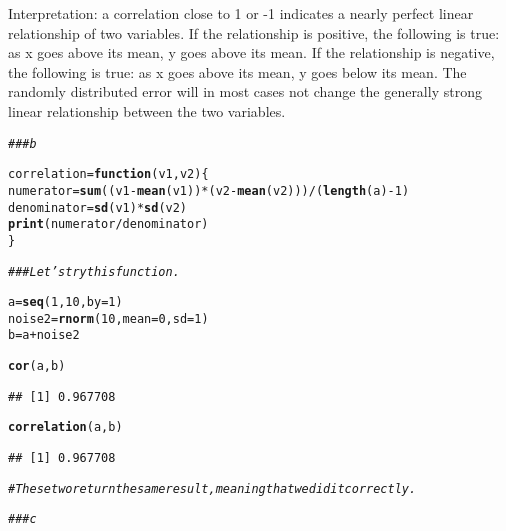 \documentclass[12pt,letter]{article}\usepackage[]{graphicx}\usepackage[]{color}
\makeatletter
\newcommand{\hlnum}[1]{\textcolor[rgb]{0.686,0.059,0.569}{#1}}%
\newcommand{\hlcom}[1]{\textcolor[rgb]{0.678,0.584,0.686}{\textit{#1}}}%
\newcommand{\hlopt}[1]{\textcolor[rgb]{0,0,0}{#1}}%
\newcommand{\hlstd}[1]{\textcolor[rgb]{0.345,0.345,0.345}{#1}}%
\newcommand{\hlkwa}[1]{\textcolor[rgb]{0.161,0.373,0.58}{\textbf{#1}}}%
\newcommand{\hlkwb}[1]{\textcolor[rgb]{0.69,0.353,0.396}{#1}}%
\newcommand{\hlkwc}[1]{\textcolor[rgb]{0.333,0.667,0.333}{#1}}%
\newcommand{\hlkwd}[1]{\textcolor[rgb]{0.737,0.353,0.396}{\textbf{#1}}}%
\newenvironment{kframe}{%
 \def\at@end@of@kframe{}%
 \ifinner\ifhmode%
  \def\at@end@of@kframe{\end{minipage}}%
  \begin{minipage}{\columnwidth}%
 \fi\fi%
 \def\FrameCommand##1{\hskip\@totalleftmargin \hskip-\fboxsep
 \colorbox{shadecolor}{##1}\hskip-\fboxsep
     \hskip-\linewidth \hskip-\@totalleftmargin \hskip\columnwidth}%
 \MakeFramed {\advance\hsize-\width
   \@totalleftmargin\z@ \linewidth\hsize
   \@setminipage}}%
 {\par\unskip\endMakeFramed%
 \at@end@of@kframe}
\newenvironment{knitrout}{}{} %
\makeatother
\begin{document}
Interpretation: a correlation close to 1 or -1 indicates a nearly perfect linear relationship of two variables. If the relationship is positive, the following is true: as x goes above its mean, y goes above its mean. If the relationship is negative, the following is true: as x goes above its mean, y goes below its mean. The randomly distributed error will in most cases not change the generally strong linear relationship between the two variables.

\begin{knitrout}
\color{fgcolor}\begin{kframe}
\begin{alltt}
\hlcom{### b}

\hlstd{correlation} \hlkwb{=} \hlkwa{function}\hlstd{(}\hlkwc{v1}\hlstd{,} \hlkwc{v2}\hlstd{) \{}
    \hlstd{numerator} \hlkwb{=} \hlkwd{sum}\hlstd{((v1} \hlopt{-} \hlkwd{mean}\hlstd{(v1))} \hlopt{*} \hlstd{(v2} \hlopt{-} \hlkwd{mean}\hlstd{(v2)))}\hlopt{/}\hlstd{(}\hlkwd{length}\hlstd{(a)} \hlopt{-} \hlnum{1}\hlstd{)}
    \hlstd{denominator} \hlkwb{=} \hlkwd{sd}\hlstd{(v1)} \hlopt{*} \hlkwd{sd}\hlstd{(v2)}
    \hlkwd{print}\hlstd{(numerator}\hlopt{/}\hlstd{denominator)}
\hlstd{\}}

\hlcom{### Let's try this function.}

\hlstd{a} \hlkwb{=} \hlkwd{seq}\hlstd{(}\hlnum{1}\hlstd{,} \hlnum{10}\hlstd{,} \hlkwc{by} \hlstd{=} \hlnum{1}\hlstd{)}
\hlstd{noise2} \hlkwb{=} \hlkwd{rnorm}\hlstd{(}\hlnum{10}\hlstd{,} \hlkwc{mean} \hlstd{=} \hlnum{0}\hlstd{,} \hlkwc{sd} \hlstd{=} \hlnum{1}\hlstd{)}
\hlstd{b} \hlkwb{=} \hlstd{a} \hlopt{+} \hlstd{noise2}

\hlkwd{cor}\hlstd{(a, b)}
\end{alltt}
\begin{verbatim}
## [1] 0.967708
\end{verbatim}
\begin{alltt}
\hlkwd{correlation}\hlstd{(a, b)}
\end{alltt}
\begin{verbatim}
## [1] 0.967708
\end{verbatim}
\begin{alltt}
\hlcom{# These two return the same result, meaning that we did it correctly.}

\hlcom{### c}


\end{alltt}
\end{kframe}
\end{knitrout}
\end{document}
